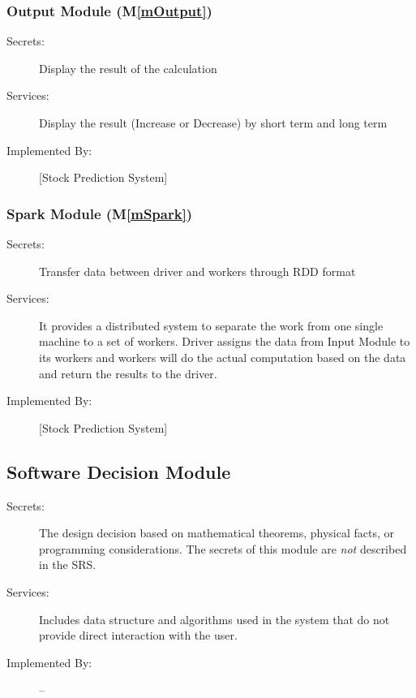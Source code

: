 \documentclass[12pt, titlepage]{article}
\newcommand{\mref}[1]{M\ref{#1}}
\begin{document}
\subsubsection{Output Module (\mref{mOutput})}
\begin{description}
\item[Secrets:] Display the result of the calculation
\item[Services:] Display the result (Increase or Decrease) by short term and long term
\item[Implemented By:] [Stock Prediction System]
\end{description}

\subsubsection{Spark Module (\mref{mSpark})}
\begin{description}
\item[Secrets:] Transfer data between driver and workers through RDD format
\item[Services:] It provides a distributed system to separate the work from one
  single machine to a set of workers. Driver assigns the data from Input Module
  to its workers and workers will do the actual computation based on the data
  and return the results to the driver. 
\item[Implemented By:] [Stock Prediction System]
\end{description}

\subsection{Software Decision Module}

\begin{description}
\item[Secrets:] The design decision based on mathematical theorems, physical
facts, or programming considerations. The secrets of this module are
\emph{not} described in the SRS.
\item[Services:] Includes data structure and algorithms used in the system that
do not provide direct interaction with the user. 
\item[Implemented By:] --
\end{description}
\end{document}
